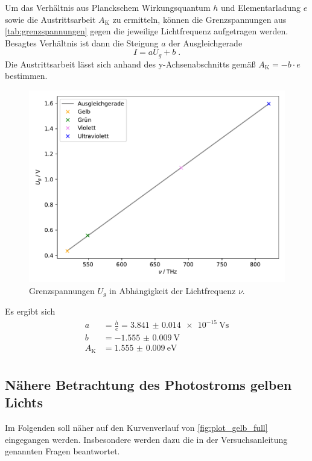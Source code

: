 Um das Verhältnis aus Planckschem Wirkungsquantum $h$ und Elementarladung $e$
sowie die Austrittsarbeit $A_\text{K}$ zu ermitteln,
können die Grenzspannungen aus \autoref{tab:grenzspannungen}
gegen die jeweilige Lichtfrequenz aufgetragen werden.
Besagtes Verhältnis ist dann die Steigung $a$ der Ausgleichgerade
\[ I = a U_g + b \; . \]
Die Austrittsarbeit lässt sich anhand des y-Achsenabschnitts gemäß $A_\text{K} = - b \cdot e$ bestimmen.

\begin{figure}[H]
  \centering
  \includegraphics[width=\textwidth]{build/plot_nu_ug.pdf}
  \caption{Grenzspannungen $U_g$ in Abhängigkeit der Lichtfrequenz $\nu$.}
  \label{fig:plot_nu_ug}
\end{figure}

Es ergibt sich
\begin{align*}
  a &= \frac{h}{e} = \SI{3.841(14)e-15}{\volt\second} \\
  b &= \SI{-1.555(9)}{\volt} \\
  A_\text{K} &= \SI{1.555(9)}{\electronvolt} \\
\end{align*}

\subsection{Nähere Betrachtung des Photostroms gelben Lichts}

Im Folgenden soll näher auf den Kurvenverlauf von \autoref{fig:plot_gelb_full} eingegangen werden.
Insbesondere werden dazu die in der Versuchsanleitung genannten Fragen \cite{versuchsanleitung} beantwortet.


